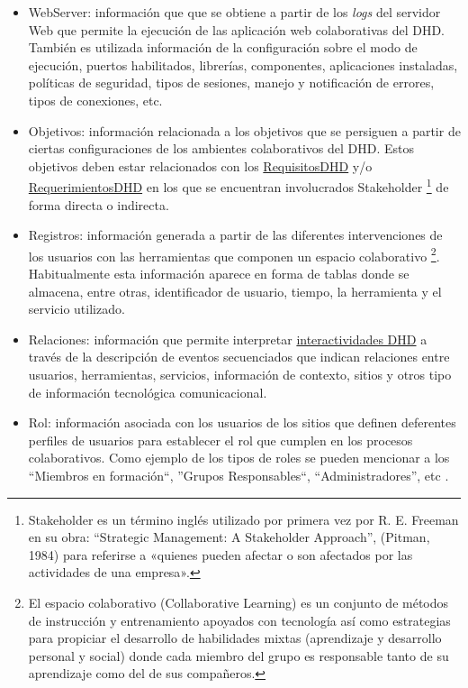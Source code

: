 \begin{itemize}
 \item WebServer: información que que se obtiene a partir de los \textit{logs}
del
servidor Web que permite la ejecución de las aplicación web colaborativas del
DHD. También es utilizada información de la configuración  sobre el modo
de ejecución, puertos habilitados, librerías, componentes, aplicaciones
instaladas, políticas de seguridad, tipos de sesiones, manejo y notificación
de errores, tipos de conexiones, etc.

\item Objetivos: información relacionada a los objetivos que se persiguen a
partir de ciertas configuraciones de los ambientes colaborativos del DHD. Estos
objetivos deben estar relacionados con los
\hyperref[requisitosdhd]{RequisitosDHD}
y/o \hyperref[requerimientosdhd]{RequerimientosDHD}
en los que se encuentran involucrados Stakeholder \footnote{Stakeholder es un
término inglés utilizado por primera vez por R. E. Freeman en su obra:
“Strategic Management: A Stakeholder Approach”, (Pitman, 1984) para referirse a
«quienes pueden afectar o son afectados por las actividades de una empresa».} de
forma directa o indirecta. 

\item Registros: información generada a partir de las diferentes
intervenciones de los usuarios con las herramientas que componen un espacio
colaborativo \footnote{El espacio colaborativo (Collaborative Learning) es
un conjunto de métodos de instrucción y entrenamiento apoyados con tecnología
así como estrategias para propiciar el desarrollo de habilidades mixtas
(aprendizaje y desarrollo personal y social) donde cada miembro del grupo es
responsable tanto de su aprendizaje como del de sus compañeros.}. Habitualmente
esta información aparece en forma de tablas donde se almacena, entre otras,
identificador de usuario, tiempo, la herramienta y el servicio utilizado.

\item Relaciones: información que permite interpretar
\hyperref[interactividadDHD]{interactividades DHD} a través de la
descripción de eventos secuenciados que indican relaciones entre usuarios,
herramientas, servicios, información de contexto, sitios y otros tipo de
información tecnológica comunicacional.

\item Rol: información asociada con los usuarios de los sitios que definen
deferentes perfiles de usuarios para establecer el rol que cumplen en los procesos
colaborativos. Como ejemplo de los tipos de roles se pueden mencionar a los
``Miembros en formación``, ''Grupos Responsables``, ``Administradores'', etc
\cite{libro}.


\end{itemize}
